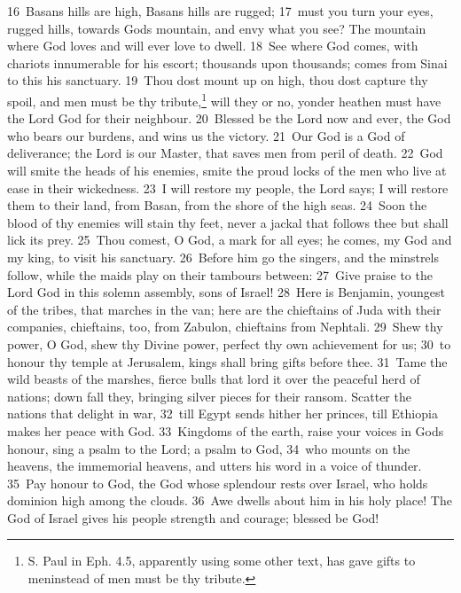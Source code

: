 \documentclass[10pt]{book} %
\begin{document}
\textcolor{benred8}{16}~Basan\textquotesingle s hills are high, Basan\textquotesingle s hills are rugged; \textcolor{benred8}{17}~must you turn your eyes, rugged hills, towards God\textquotesingle s mountain, and envy what you see? The mountain where God loves and will ever love to dwell. \textcolor{benred8}{18}~See where God comes, with chariots innumerable for his escort; thousands upon thousands; comes from Sinai to this his sanctuary. \textcolor{benred8}{19}~Thou dost mount up on high, thou dost capture thy spoil, and men must be thy tribute,\footnote[2]{S. Paul in Eph. 4.5, apparently using some other text, has \textasciigrave gave gifts to men\textquotesingle  instead of \textasciigrave men must be thy tribute\textquotesingle .} will they or no, yonder heathen must have the Lord God for their neighbour. \textcolor{benred8}{20}~Blessed be the Lord now and ever, the God who bears our burdens, and wins us the victory. \textcolor{benred8}{21}~Our God is a God of deliverance; the Lord is our Master, that saves men from peril of death. \textcolor{benred8}{22}~God will smite the heads of his enemies, smite the proud locks of the men who live at ease in their wickedness. \textcolor{benred8}{23}~I will restore my people, the Lord says; I will restore them to their land, from Basan, from the shore of the high seas. \textcolor{benred8}{24}~Soon the blood of thy enemies will stain thy feet, never a jackal that follows thee but shall lick its prey. \textcolor{benred8}{25}~Thou comest, O God, a mark for all eyes; he comes, my God and my king, to visit his sanctuary. \textcolor{benred8}{26}~Before him go the singers, and the minstrels follow, while the maids play on their tambours between: \textcolor{benred8}{27}~Give praise to the Lord God in this solemn assembly, sons of Israel! \textcolor{benred8}{28}~Here is Benjamin, youngest of the tribes, that marches in the van; here are the chieftains of Juda with their companies, chieftains, too, from Zabulon, chieftains from Nephtali.
\textcolor{benred8}{29}~Shew thy power, O God, shew thy Divine power, perfect thy own achievement for us; \textcolor{benred8}{30}~to honour thy temple at Jerusalem, kings shall bring gifts before thee. \textcolor{benred8}{31}~Tame the wild beasts of the marshes, fierce bulls that lord it over the peaceful herd of nations; down fall they, bringing silver pieces for their ransom. Scatter the nations that delight in war, \textcolor{benred8}{32}~till Egypt sends hither her princes, till Ethiopia makes her peace with God. \textcolor{benred8}{33}~Kingdoms of the earth, raise your voices in God\textquotesingle s honour, sing a psalm to the Lord; a psalm to God, \textcolor{benred8}{34}~who mounts on the heavens, the immemorial heavens, and utters his word in a voice of thunder. \textcolor{benred8}{35}~Pay honour to God, the God whose splendour rests over Israel, who holds dominion high among the clouds. \textcolor{benred8}{36}~Awe dwells about him in his holy place! The God of Israel gives his people strength and courage; blessed be God!
\end{document}
